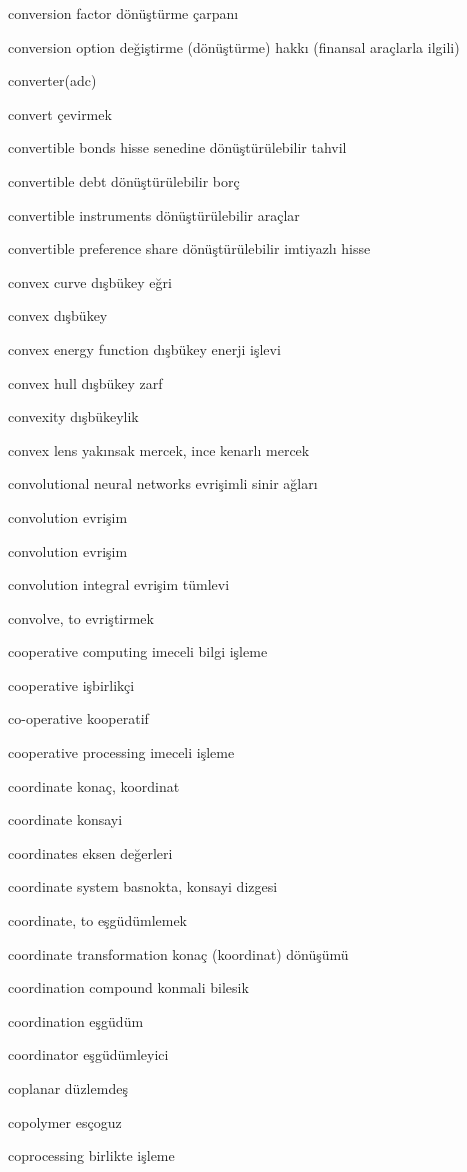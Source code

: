 \documentclass[12pt,fleqn]{article}\usepackage{../../common}
\begin{document}
conversion factor dönüştürme çarpanı

conversion option değiştirme (dönüştürme) hakkı (finansal araçlarla ilgili)

converter(adc)

convert çevirmek

convertible bonds hisse senedine dönüştürülebilir tahvil

convertible debt dönüştürülebilir borç

convertible instruments dönüştürülebilir araçlar

convertible preference share dönüştürülebilir imtiyazlı hisse

convex curve dışbükey eğri

convex dışbükey

convex energy function dışbükey enerji işlevi

convex hull dışbükey zarf

convexity dışbükeylik

convex lens yakınsak mercek, ince kenarlı mercek

convolutional neural networks evrişimli sinir ağları

convolution evrişim

convolution evrişim

convolution integral evrişim tümlevi

convolve, to evriştirmek

cooperative computing imeceli bilgi işleme

cooperative işbirlikçi

co-operative kooperatif

cooperative processing imeceli işleme

coordinate konaç, koordinat

coordinate konsayi

coordinates eksen değerleri

coordinate system basnokta, konsayi dizgesi

coordinate, to eşgüdümlemek

coordinate transformation konaç (koordinat) dönüşümü

coordination compound konmali bilesik

coordination eşgüdüm

coordinator eşgüdümleyici

coplanar düzlemdeş

copolymer esçoguz

coprocessing birlikte işleme
\end{document}
